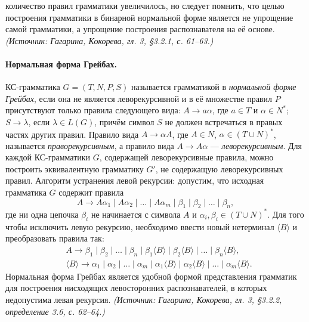 \documentclass[a4paper,12pt]{article}
\begin{document}
количество правил грамматики увеличилось, но следует помнить, что целью построения грамматики в бинарной нормальной форме является не упрощение самой грамматики, а упрощение построения распознавателя на её основе.
\textit{(Источник: Гагарина, Кокорева, гл. 3, §3.2.1, с. 61--63.)}

\paragraph{Нормальная форма Грейбах.}
КС-грамматика \(G=(T,N,P,S)\) называется грамматикой в \emph{нормальной форме Грейбах}, если она не является леворекурсивной и в её множестве правил \(P\) присутствуют только правила следующего вида: \(A\to a\alpha\), где \(a\in T\) и \(\alpha\in N^*\); \(S\to\lambda\), если \(\lambda\in L(G)\), причём символ \(S\) не должен встречаться в правых частях других правил. Правило вида \(A\to\alpha A\), где \(A\in N\), \(\alpha\in(T\cup N)^*\), называется \emph{праворекурсивным}, а правило вида \(A\to A\alpha\) — \emph{леворекурсивным}. Для каждой КС-грамматики \(G\), содержащей леворекурсивные правила, можно построить эквивалентную грамматику \(G'\), не содержащую леворекурсивных правил. Алгоритм устранения левой рекурсии: допустим, что исходная грамматика \(G\) содержит правила
\[
A\to A\alpha_1\mid A\alpha_2\mid\ldots\mid A\alpha_m\mid\beta_1\mid\beta_2\mid\ldots\mid\beta_n,
\]
где ни одна цепочка \(\beta_i\) не начинается с символа \(A\) и \(\alpha_i,\beta_i\in(T\cup N)^*\). Для того чтобы исключить левую рекурсию, необходимо ввести новый нетерминал \(\langle B\rangle\) и преобразовать правила так:
\[
\begin{aligned}
&A\to\beta_1\mid\beta_2\mid\ldots\mid\beta_n\mid\beta_1\langle B\rangle\mid\beta_2\langle B\rangle\mid\ldots\mid\beta_n\langle B\rangle,\\
&\langle B\rangle\to\alpha_1\mid\alpha_2\mid\ldots\mid\alpha_m\mid\alpha_1\langle B\rangle\mid\alpha_2\langle B\rangle\mid\ldots\mid\alpha_m\langle B\rangle.
\end{aligned}
\]
Нормальная форма Грейбах является удобной формой представления грамматик для построения нисходящих левосторонних распознавателей, в которых недопустима левая рекурсия.
\textit{(Источник: Гагарина, Кокорева, гл. 3, §3.2.2, определение 3.6, с. 62--64.)}
\end{document}
